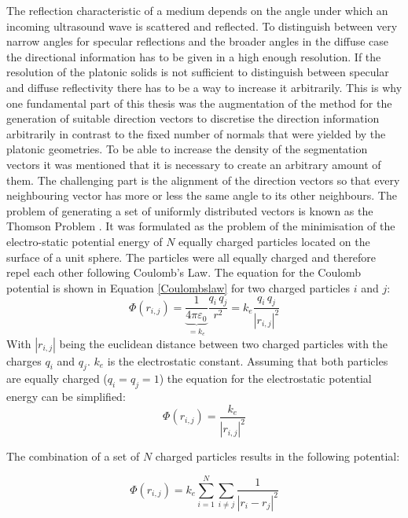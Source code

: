 The reflection characteristic of a medium depends on the angle under which an incoming ultrasound wave is scattered and reflected. To distinguish between very narrow angles for specular reflections and the broader angles in the diffuse case the directional information has to be given in a high enough resolution. If the resolution of the platonic solids is not sufficient to distinguish between specular and diffuse reflectivity there has to be a way to increase it arbitrarily.
This is why one fundamental part of this thesis was the augmentation of the method for the generation of suitable direction vectors to discretise the direction information arbitrarily in contrast to the fixed number of normals that were yielded by the platonic geometries. To be able to increase the density of the segmentation vectors it was mentioned that it is necessary to create an arbitrary amount of them. The challenging part is the alignment of the direction vectors so that every neighbouring vector has more or less the same angle to its other neighbours.
The problem of generating a set of uniformly distributed vectors is known as the Thomson Problem \cite{Thomson1904Structure}. It was formulated as the problem of the minimisation of the electro-static potential energy of $N$ equally charged particles located on the surface of a unit sphere. The particles were all equally charged and therefore repel each other following Coulomb's Law. The equation for the Coulomb potential is shown in Equation \ref{Coulombslaw} for two charged particles $i$ and $j$:
\begin{equation}
\Phi(r_{i,j}) = \underset{=k_e}{\underbrace{\frac{1}{4\pi\varepsilon_0}}} \frac{q_i \, q_j}{r^2} =  k_e \frac{q_i \, q_j}{{|r_{i,j}|}^2} 
\label{Coulombslaw}
\end{equation}
With $|r_{i,j}|$ being the euclidean distance between two charged particles with the charges $q_i$ and $q_j$. $k_e$ is the electrostatic constant. Assuming that both particles are equally charged ($q_i = q_j = 1$) the equation for the electrostatic potential energy can be simplified:
\begin{equation}
\Phi(r_{i,j}) = \frac{k_e}{{|r_{i,j}|}^2} 
\label{Coulombslaw_simple}
\end{equation}

The combination of a set of $N$ charged particles results in the following potential:

\begin{equation}
\Phi(r_{i,j}) = k_e \sum_{i = 1}^{N}\sum_{i \neq j}^{}\frac{1}{{|r_{i}-r_{j}|}^2} 
\label{Coulombslaw_simple_set_n}
\end{equation}


